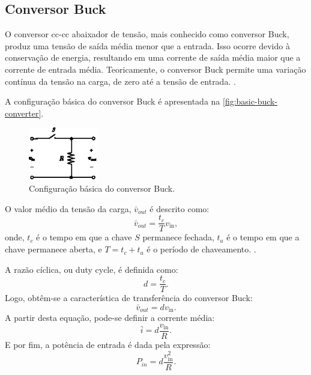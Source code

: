 \subsection{Conversor Buck} \label{section:buck_converter}

O conversor \acrshort{cc}-\acrshort{cc} abaixador de tensão, mais conhecido como conversor Buck, produz uma tensão de saída média menor que a entrada. Isso ocorre devido à conservação de energia, resultando em uma corrente de saída média maior que a corrente de entrada média. Teoricamente, o conversor Buck permite uma variação contínua da tensão na carga, de zero até a tensão de entrada. \cite{martins2008}.

A configuração básica do conversor Buck é apresentada na \autoref{fig:basic-buck-converter}.

\begin{figure}[H]
  \centering
  \includegraphics[width=0.27\textwidth]{figuras/basic_buck_conversor.eps}
  \caption{Configuração básica do conversor Buck.}
  \label{fig:basic-buck-converter}
\end{figure}

O valor médio da tensão da carga, $\bar{v}_{out}$ é descrito como: \begin{equation} \bar{v}_{out} = \frac{t_c}{T}v_{\mathrm{in}}, \end{equation} onde, $t_c$ é o tempo em que a chave $S$ permanece fechada, $t_a$ é o tempo em que a chave permanece aberta, e $T = t_c + t_a$ é o período de chaveamento. \cite{martins2008}.

A razão cíclica, ou duty cycle, é definida como: \begin{equation} d = \frac{t_c}{T}. \end{equation} Logo, obtêm-se a característica de transferência do conversor Buck: \begin{equation} \bar{v}_{out} = dv_{\mathrm{in}}. \label{eq:buck_feature}\end{equation} A partir desta equação, pode-se definir a corrente média: \begin{equation} \bar{i} = d\frac{v_{\mathrm{in}}}{R}. \end{equation} E por fim, a potência de entrada é dada pela expressão: \begin{equation} P_{in} = d \frac{v_{\mathrm{in}}^2}{R}. \end{equation}

